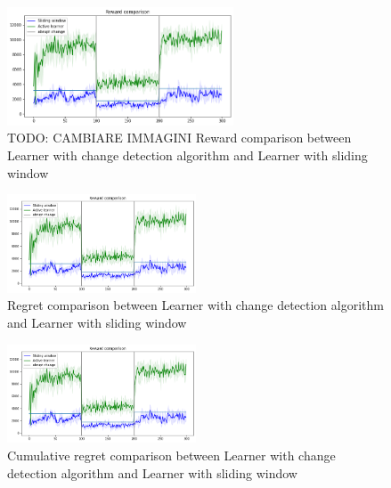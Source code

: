 \begin{figure}[ht]
    \begin{center}
    \includegraphics[width=0.6\textwidth]{img/sw_vs_active_reward.png}
    \caption{TODO: CAMBIARE IMMAGINI Reward comparison between Learner with change detection algorithm and Learner with sliding window}
    \label{fig:reward63}
    \end{center}
\end{figure}
\begin{multicols}{2}
    \begin{figure}[H]
        \begin{center}
        \includegraphics[width=0.5\textwidth]{img/sw_vs_active_reward.png}
        \caption{Regret comparison between Learner with change detection algorithm and Learner with sliding window}
        \label{fig:regret63}
        \end{center}
    \end{figure}
    \columnbreak
    \begin{figure}[H]
        \begin{center}
        \includegraphics[width=0.5\textwidth]{img/sw_vs_active_reward.png}
        \caption{Cumulative regret comparison between Learner with change detection algorithm and Learner with sliding window}
        \label{fig:cum_reg63}
        \end{center}
    \end{figure}
\end{multicols}

